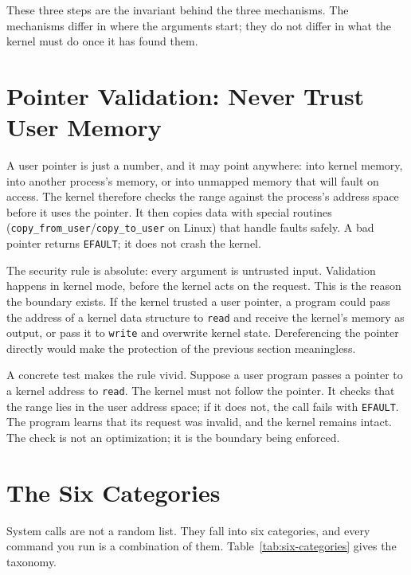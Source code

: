 \documentclass[11pt]{article}
\begin{document}
These three steps are the invariant behind the three mechanisms. The mechanisms
differ in where the arguments start; they do not differ in what the kernel must
do once it has found them.

\section{Pointer Validation: Never Trust User Memory}

A user pointer is just a number, and it may point anywhere: into kernel memory,
into another process's memory, or into unmapped memory that will fault on
access. The kernel therefore checks the range against the process's address
space before it uses the pointer. It then copies data with special routines
(\texttt{copy\_from\_user}/\texttt{copy\_to\_user} on Linux) that handle
faults safely. A bad pointer returns \texttt{EFAULT}; it does not crash the
kernel.

The security rule is absolute: every argument is untrusted input. Validation
happens in kernel mode, before the kernel acts on the request. This is the
reason the boundary exists. If the kernel trusted a user pointer, a program
could pass the address of a kernel data structure to \texttt{read} and receive
the kernel's memory as output, or pass it to \texttt{write} and overwrite kernel
state. Dereferencing the pointer directly would make the protection of the
previous section meaningless.

A concrete test makes the rule vivid. Suppose a user program passes a pointer
to a kernel address to \texttt{read}. The kernel must not follow the pointer.
It checks that the range lies in the user address space; if it does not, the
call fails with \texttt{EFAULT}. The program learns that its request was
invalid, and the kernel remains intact. The check is not an optimization; it is
the boundary being enforced.

\section{The Six Categories}

\noindent{}

System calls are not a random list. They fall into six categories, and every
command you run is a combination of them. Table~\ref{tab:six-categories} gives
the taxonomy.
\end{document}
